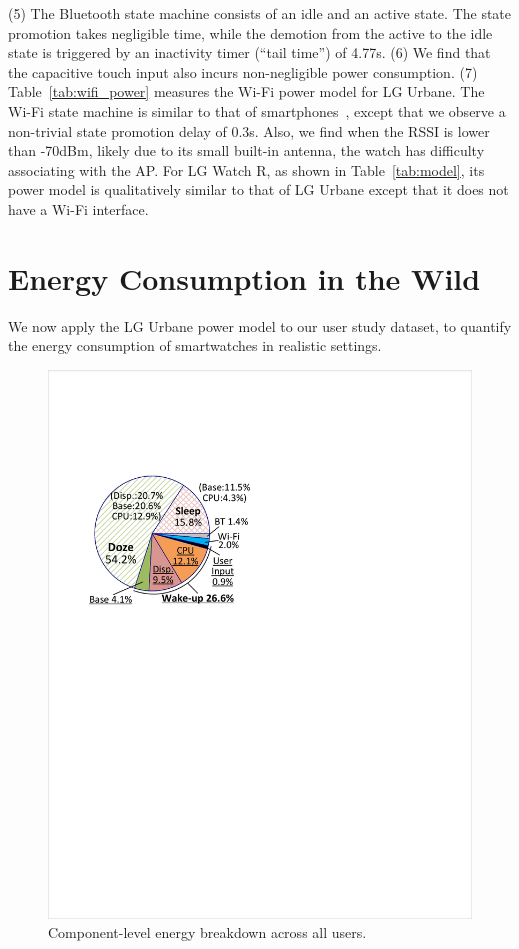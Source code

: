 (5) The Bluetooth state machine consists of an idle and an active state. The state promotion takes negligible time, while the demotion from the active to the idle state is triggered by an inactivity timer (``tail time'') of 4.77s.
(6) We find that the capacitive touch input also incurs non-negligible power consumption.
(7) Table~\ref{tab:wifi_power} measures the Wi-Fi power model for LG Urbane. The Wi-Fi state machine is similar to that of smartphones~\cite{chen15:mobicom, nika:www}, except that we observe a non-trivial state promotion delay of 0.3s. Also, we find when the RSSI is lower than -70dBm, likely due to its small built-in antenna,  the watch has difficulty associating with the AP. For LG Watch R, as shown in Table~\ref{tab:model}, its power model is qualitatively similar to that of LG Urbane except that it does not have a Wi-Fi interface.



\section{Energy Consumption in the Wild}
We now apply the LG Urbane power model to our user study dataset, to quantify the energy consumption of smartwatches in realistic settings.

\begin{figure}[t]
	\footnotesize
	\centering
	\includegraphics[width=.5\textwidth]{figs/smartwatch/energy_breakdown2.pdf} %
	\caption{\footnotesize Component-level energy breakdown across all users.}
	\vspace{-.1in}
	\label{fig:energy}
\end{figure}

